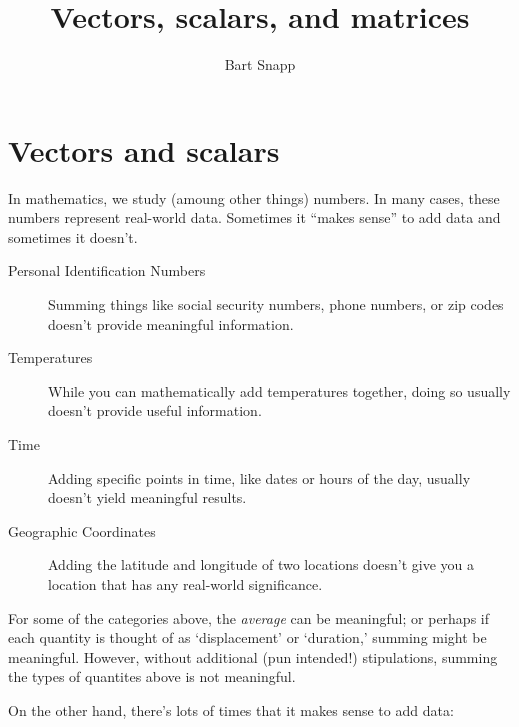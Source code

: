\documentclass{ximera}
\author{Bart Snapp}
\title{Vectors, scalars, and matrices}
\begin{document}
\begin{abstract}
\end{abstract}
\maketitle


\section{Vectors and scalars}

In mathematics, we study (amoung other things) numbers. In many cases,
these numbers represent real-world data. Sometimes it ``makes sense''
to add data and sometimes it doesn't.
\begin{description}
\item[Personal Identification Numbers] Summing things like social
  security numbers, phone numbers, or zip codes doesn't provide
  meaningful information.
\item[Temperatures] While you can mathematically add temperatures
  together, doing so usually doesn't provide useful information.
\item[Time] Adding specific points in time, like dates or hours of the
  day, usually doesn't yield meaningful results. 
\item[Geographic Coordinates] Adding the latitude and longitude of two
  locations doesn't give you a location that has any real-world
  significance.
\end{description}
For some of the categories above, the \textit{average} can be
meaningful; or perhaps if each quantity is thought of as
`displacement' or `duration,' summing might be meaningful. However,
without additional (pun intended!) stipulations, summing the types of
quantites above is not meaningful.


On the other hand, there's lots of times that it makes sense to add data:
\end{document}
